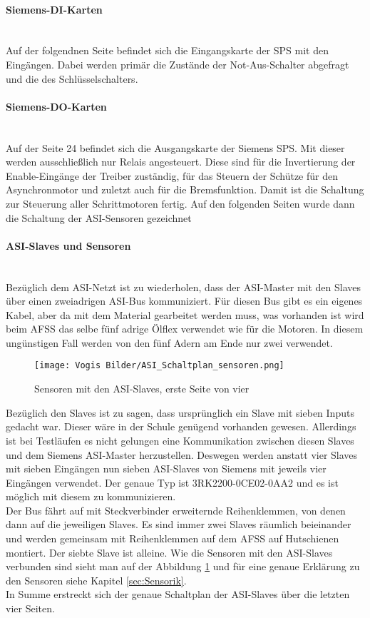     \paragraph{Siemens-DI-Karten}\mbox{}\\
    Auf der folgendnen Seite befindet sich die Eingangskarte der SPS mit den Eingängen. Dabei werden primär die Zustände der Not-Aus-Schalter abgefragt und die des Schlüsselschalters.
    \paragraph{Siemens-DO-Karten}\mbox{}\\
    Auf der Seite 24 befindet sich die Ausgangskarte der Siemens SPS. Mit dieser werden ausschließlich nur Relais angesteuert. Diese sind für die Invertierung der Enable-Eingänge der Treiber zuständig, für das Steuern der Schütze für den Asynchronmotor und zuletzt auch für die Bremsfunktion. Damit ist die Schaltung zur Steuerung aller Schrittmotoren fertig. Auf den folgenden Seiten wurde dann die Schaltung der ASI-Sensoren gezeichnet
    \paragraph{ASI-Slaves und Sensoren}\mbox{}\\
    Bezüglich dem ASI-Netzt ist zu wiederholen, dass der ASI-Master mit den Slaves über einen zweiadrigen ASI-Bus kommuniziert. Für diesen Bus gibt es ein eigenes Kabel, aber da mit dem Material gearbeitet werden muss, was vorhanden ist wird beim AFSS das selbe fünf adrige Ölflex verwendet wie für die Motoren. In diesem ungünstigen Fall werden von den fünf Adern am Ende nur zwei verwendet.\\
    \begin{figure}[h]
        \centering
        \texttt{[image: Vogis Bilder/ASI\_Schaltplan\_sensoren.png]}
        \caption{Sensoren mit den ASI-Slaves, erste Seite von vier}
        \label{fig:ASI_Sensoren}
    \end{figure}
    Bezüglich den Slaves ist zu sagen, dass ursprünglich ein Slave mit sieben Inputs gedacht war. Dieser wäre in der Schule genügend vorhanden gewesen. Allerdings ist bei Testläufen es nicht gelungen eine Kommunikation zwischen diesen Slaves und dem Siemens ASI-Master herzustellen. Deswegen werden anstatt vier Slaves mit sieben Eingängen nun sieben ASI-Slaves von Siemens mit jeweils vier Eingängen verwendet. Der genaue Typ ist 3RK2200-0CE02-0AA2 und es ist möglich mit diesem zu kommunizieren.\\
    Der Bus fährt auf mit Steckverbinder erweiternde Reihenklemmen, von denen dann auf die jeweiligen Slaves. Es sind immer zwei Slaves räumlich beieinander und werden gemeinsam mit Reihenklemmen auf dem AFSS auf Hutschienen montiert. Der siebte Slave ist alleine. Wie die Sensoren mit den ASI-Slaves verbunden sind sieht man auf der Abbildung \ref{fig:ASI_Sensoren} und für eine genaue Erklärung zu den Sensoren siehe Kapitel \ref{sec:Sensorik}.\\
    In Summe erstreckt sich der genaue Schaltplan der ASI-Slaves über die letzten vier Seiten.
